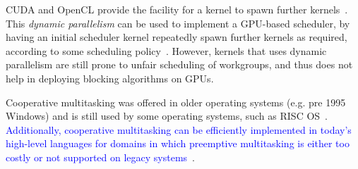 \documentclass[sigconf]{acmart}
\newcommand{\TSAdded}[1]{\textcolor{blue}{#1}}
\begin{document}
{CUDA and OpenCL provide the facility for a kernel to spawn further
kernels~\cite{cuda-75}.  This \emph{dynamic parallelism} can be used
to implement a GPU-based scheduler, by having an initial scheduler
kernel repeatedly spawn further kernels as required, according to some
scheduling policy~\cite{DBLP:conf/ppopp/Muyan-OzcelikO16}.  However,
kernels that uses dynamic parallelism are still prone to unfair
scheduling of workgroups, and thus does not help in deploying blocking
algorithms on GPUs.


%



%


%
Cooperative multitasking was offered in older operating systems
(e.g. pre 1995 Windows) and is still used by some operating systems,
such as RISC OS~\cite{risc-os-multitasking}. \TSAdded{Additionally,
  cooperative multitasking can be efficiently implemented in today's
  high-level languages for domains in which preemptive multitasking is
  either too costly or not supported on legacy
  systems~\cite{Tarpenning:1991:CMC:136810.136820}}.

}
\end{document}
